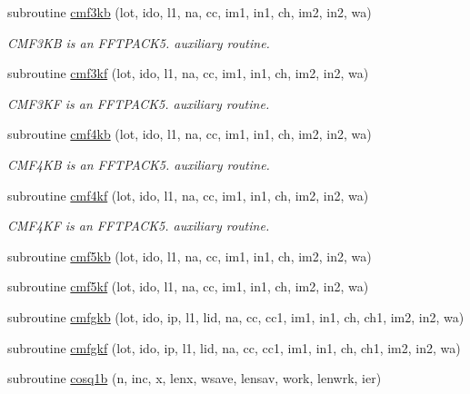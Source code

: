 \begin{DoxyCompactItemize}
subroutine \mbox{\hyperlink{namespacefftclass_afc9e57527719d38dc3716ee9bf6b090d}{cmf3kb}} (lot, ido, l1, na, cc, im1, in1, ch, im2, in2, wa)
\begin{DoxyCompactList}\small\item\em C\+M\+F3\+KB is an F\+F\+T\+P\+A\+C\+K5. auxiliary routine. \end{DoxyCompactList}\item 
subroutine \mbox{\hyperlink{namespacefftclass_a449e799516aa491a87b0f5937a7abc86}{cmf3kf}} (lot, ido, l1, na, cc, im1, in1, ch, im2, in2, wa)
\begin{DoxyCompactList}\small\item\em C\+M\+F3\+KF is an F\+F\+T\+P\+A\+C\+K5. auxiliary routine. \end{DoxyCompactList}\item 
subroutine \mbox{\hyperlink{namespacefftclass_ad51087e9f2795e7bf337d4c6b55de780}{cmf4kb}} (lot, ido, l1, na, cc, im1, in1, ch, im2, in2, wa)
\begin{DoxyCompactList}\small\item\em C\+M\+F4\+KB is an F\+F\+T\+P\+A\+C\+K5. auxiliary routine. \end{DoxyCompactList}\item 
subroutine \mbox{\hyperlink{namespacefftclass_acdd67c6a77ecec55c036ab8899c07dee}{cmf4kf}} (lot, ido, l1, na, cc, im1, in1, ch, im2, in2, wa)
\begin{DoxyCompactList}\small\item\em C\+M\+F4\+KF is an F\+F\+T\+P\+A\+C\+K5. auxiliary routine. \end{DoxyCompactList}\item 
subroutine \mbox{\hyperlink{namespacefftclass_a4bf0caaf1c5caeb50490706cd35d82c5}{cmf5kb}} (lot, ido, l1, na, cc, im1, in1, ch, im2, in2, wa)
\item 
subroutine \mbox{\hyperlink{namespacefftclass_a59cb57b66516dd0b08cf36e366933c56}{cmf5kf}} (lot, ido, l1, na, cc, im1, in1, ch, im2, in2, wa)
\item 
subroutine \mbox{\hyperlink{namespacefftclass_ab1c60a144232626a03fad4dd30f88d7d}{cmfgkb}} (lot, ido, ip, l1, lid, na, cc, cc1, im1, in1, ch, ch1, im2, in2, wa)
\item 
subroutine \mbox{\hyperlink{namespacefftclass_a317b5c8887b5c2ecb7e518f0c7058589}{cmfgkf}} (lot, ido, ip, l1, lid, na, cc, cc1, im1, in1, ch, ch1, im2, in2, wa)
\item 
subroutine \mbox{\hyperlink{namespacefftclass_a6684b378360642f160b255df6b3aa0bd}{cosq1b}} (n, inc, x, lenx, wsave, lensav, work, lenwrk, ier)

\end{DoxyCompactItemize}
